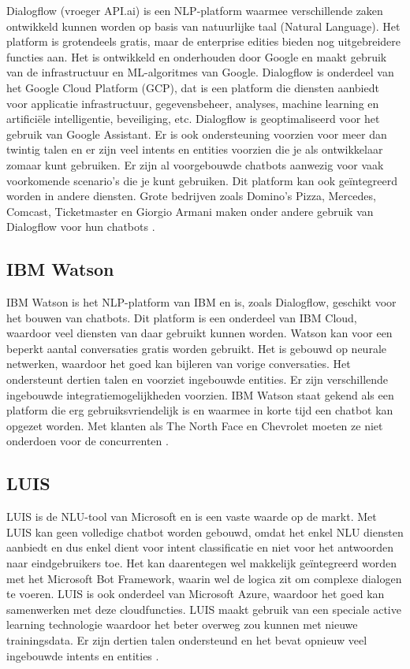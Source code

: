 Dialogflow (vroeger API.ai) is een NLP-platform waarmee verschillende zaken ontwikkeld kunnen worden op basis van natuurlijke taal (Natural Language). Het platform is grotendeels gratis, maar de enterprise edities bieden nog uitgebreidere functies aan. Het is ontwikkeld en onderhouden door Google en maakt gebruik van de infrastructuur en ML-algoritmes van Google. Dialogflow is onderdeel van het Google Cloud Platform (GCP), dat is een platform die diensten aanbiedt voor applicatie infrastructuur, gegevensbeheer, analyses, machine learning en artificiële intelligentie, beveiliging, etc. Dialogflow is geoptimaliseerd voor het gebruik van Google Assistant. Er is ook ondersteuning voorzien voor meer dan twintig talen en er zijn veel intents en entities voorzien die je als ontwikkelaar zomaar kunt gebruiken. Er zijn al voorgebouwde chatbots aanwezig voor vaak voorkomende scenario’s die je kunt gebruiken. Dit platform kan ook geïntegreerd worden in andere diensten. Grote bedrijven zoals Domino’s Pizza, Mercedes, Comcast, Ticketmaster en Giorgio Armani maken onder andere gebruik van Dialogflow voor hun chatbots \autocite{Dialogflow2020}. 

\subsection{IBM Watson}
\label{subsec:nlp-platformen-ibm-watson}

IBM Watson is het NLP-platform van IBM en is, zoals Dialogflow, geschikt voor het bouwen van chatbots. Dit platform is een onderdeel van IBM Cloud, waardoor veel diensten van daar gebruikt kunnen worden. Watson kan voor een beperkt aantal conversaties gratis worden gebruikt. Het is gebouwd op neurale netwerken, waardoor het goed kan bijleren van vorige conversaties. Het ondersteunt dertien talen en voorziet ingebouwde entities. Er zijn verschillende ingebouwde integratiemogelijkheden voorzien. IBM Watson staat gekend als een platform die erg gebruiksvriendelijk is en waarmee in korte tijd een chatbot kan opgezet worden. Met klanten als The North Face en Chevrolet moeten ze niet onderdoen voor de concurrenten \autocite{IBM2020}.


\subsection{LUIS}
\label{subsec:nlp-platformen-luis} 

LUIS is de NLU-tool van Microsoft en is een vaste waarde op de markt. Met LUIS kan geen volledige chatbot worden gebouwd, omdat het enkel NLU diensten aanbiedt en dus enkel dient voor intent classificatie en niet voor het antwoorden naar eindgebruikers toe.  Het kan daarentegen wel makkelijk geïntegreerd worden met het Microsoft Bot Framework, waarin wel de logica zit om complexe dialogen te voeren. LUIS is ook onderdeel van Microsoft Azure, waardoor het  goed kan samenwerken met deze cloudfuncties. LUIS maakt gebruik van een speciale active learning technologie waardoor het beter overweg zou kunnen met nieuwe trainingsdata. Er zijn dertien talen ondersteund en het bevat opnieuw veel ingebouwde intents en entities \autocite{LUIS2020}.

